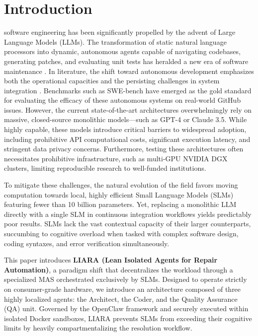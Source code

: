 \documentclass[10pt,journal,compsoc]{IEEEtran}
\begin{document}
\section{Introduction}
\label{sec:intro}
 software engineering has been significantly propelled by the advent of Large Language Models (LLMs). The transformation of static natural language processors into dynamic, autonomous agents capable of navigating codebases, generating patches, and evaluating unit tests has heralded a new era of software maintenance \cite{e2024_5}. In literature, the shift toward autonomous development emphasizes both the operational capacities and the persisting challenges in system integration \cite{m2025_23}. Benchmarks such as SWE-bench have emerged as the gold standard for evaluating the efficacy of these autonomous systems on real-world GitHub issues. However, the current state-of-the-art architectures overwhelmingly rely on massive, closed-source monolithic models—such as GPT-4 or Claude 3.5. While highly capable, these models introduce critical barriers to widespread adoption, including prohibitive API computational costs, significant execution latency, and stringent data privacy concerns. Furthermore, testing these architectures often necessitates prohibitive infrastructure, such as multi-GPU NVIDIA DGX clusters, limiting reproducible research to well-funded institutions.

To mitigate these challenges, the natural evolution of the field favors moving computation towards local, highly efficient Small Language Models (SLMs) featuring fewer than 10 billion parameters. Yet, replacing a monolithic LLM directly with a single SLM in continuous integration workflows yields predictably poor results. SLMs lack the vast contextual capacity of their larger counterparts, succumbing to cognitive overload when tasked with complex software design, coding syntaxes, and error verification simultaneously.

This paper introduces \textbf{LIARA (Lean Isolated Agents for Repair Automation)}, a paradigm shift that decentralizes the workload through a specialized MAS orchestrated exclusively by SLMs. Designed to operate strictly on consumer-grade hardware, we introduce an architecture composed of three highly localized agents: the Architect, the Coder, and the Quality Assurance (QA) unit. Governed by the OpenClaw framework and securely executed within isolated Docker sandboxes, LIARA prevents SLMs from exceeding their cognitive limits by heavily compartmentalizing the resolution workflow. 
\end{document}
